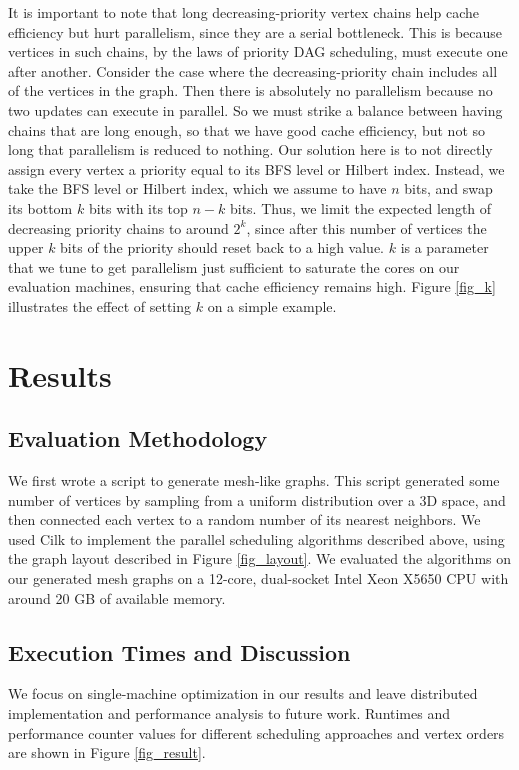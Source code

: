 \documentclass[journal]{IEEEtran}
\begin{document}
It is important to note that long decreasing-priority vertex chains help cache efficiency but hurt parallelism, since they are a serial bottleneck. This is because vertices in such chains, by the laws of priority DAG scheduling, must execute one after another. Consider the case where the decreasing-priority chain includes all of the vertices in the graph. Then there is absolutely no parallelism because no two updates can execute in parallel. So we must strike a balance between having chains that are long enough, so that we have good cache efficiency, but not so long that parallelism is reduced to nothing. Our solution here is to not directly assign every vertex a priority equal to its BFS level or Hilbert index. Instead, we take the BFS level or Hilbert index, which we assume to have $n$ bits, and swap its bottom $k$ bits with its top $n-k$ bits. Thus, we limit the expected length of decreasing priority chains to around $2^k$, since after this number of vertices the upper $k$ bits of the priority should reset back to a high value. $k$ is a parameter that we tune to get parallelism just sufficient to saturate the cores on our evaluation machines, ensuring that cache efficiency remains high. Figure \ref{fig_k} illustrates the effect of setting $k$ on a simple example.

\section{Results}

\subsection{Evaluation Methodology}
We first wrote a script to generate mesh-like graphs. This script generated some number of vertices by sampling from a uniform distribution over a 3D space, and then connected each vertex to a random number of its nearest neighbors. We used Cilk to implement the parallel scheduling algorithms described above, using the graph layout described in Figure \ref{fig_layout}. We evaluated the algorithms on our generated mesh graphs on a 12-core, dual-socket Intel Xeon X5650 CPU with around 20 GB of available memory.

\subsection{Execution Times and Discussion}
We focus on single-machine optimization in our results and leave distributed implementation and performance analysis to future work. Runtimes and performance counter values for different scheduling approaches and vertex orders are shown in Figure \ref{fig_result}.
\end{document}
